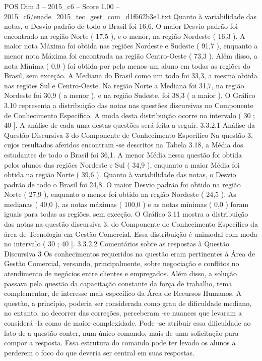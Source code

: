 \begin{textsample}{POS Dim 3 – 2015\_c6 – Score 1.00 – 2015\_c6/enade\_2015\_tec\_gest\_com\_d1f662b3e1.txt}
Quanto à variabilidade das notas, o Desvio padrão de todo o Brasil foi 16,6.
O maior Desvio padrão foi encontrado na região Norte ( 17,5 ), e o menor, na região Nordeste ( 16,3 ).
A maior nota Máxima foi obtida nas regiões Nordeste e Sudeste ( 91,7 ), enquanto a menor nota Máxima foi encontrada na região Centro-Oeste ( 73,3 ).
Além disso, a nota Mínima ( 0,0 ) foi obtida por pelo menos um aluno em todas as regiões do Brasil, sem exceção.
A Mediana do Brasil como um todo foi 33,3, a mesma obtida nas regiões Sul e Centro-Oeste.
Na região Norte a Mediana foi 31,7, na região Nordeste foi 30,9 ( a menor ), e na região Sudeste, foi 38,3 ( a maior ).
O Gráfico 3.10 representa a distribuição das notas nas questões discursivas no Componente de Conhecimento Específico.
A moda desta distribuição ocorre no intervalo ( 30 ; 40 ].
A análise de cada uma destas questões será feita a seguir. 3.3.2.1 Análise da Questão Discursiva 3 do Componente de Conhecimento Específico Na questão 3, cujos resultados aferidos encontram -se descritos na Tabela 3.18, a Média dos estudantes de todo o Brasil foi 36,1.
A menor Média nessa questão foi obtida pelos alunos das regiões Nordeste e Sul ( 34,9 ), enquanto a maior Média foi obtida na região Norte ( 39,6 ).
Quanto à variabilidade das notas, o Desvio padrão de todo o Brasil foi 24,8.
O maior Desvio padrão foi obtido na região Norte ( 27,9 ), enquanto o menor foi obtido na região Nordeste ( 24,5 ).
As medianas ( 40,0 ), as notas máximas ( 100,0 ) e as notas mínimas ( 0,0 ) foram iguais para todas as regiões, sem exceção.
O Gráfico 3.11 mostra a distribuição das notas na questão discursiva 3, do Componente de Conhecimento Específico da área de Tecnologia em Gestão Comercial.
Essa distribuição é unimodal com moda no intervalo ( 30 ; 40 ]. 3.3.2.2 Comentários sobre as respostas à Questão Discursiva 3 Os conhecimentos requeridos na questão eram pertinentes à Área de Gestão Comercial, versando, principalmente, sobre negociação e conflitos no atendimento de negócios entre clientes e empregados.
Além disso, a solução passava pela questão da capacitação constante da força de trabalho, tema complementar, de interesse mais específico da Área de Recursos Humanos.
A questão, a princípio, poderia ser considerada como grau de dificuldade mediano, no entanto, no decorrer das correções, perceberam -se nuances que levaram a considerá -la como de maior complexidade.
Pode -se atribuir essa dificuldade ao fato de a questão conter, num único comando, mais de uma solicitação para compor a resposta.
Essa estrutura do comando pode ter levado os alunos a perderem o foco do que deveria ser central em suas respostas.

\end{textsample}
